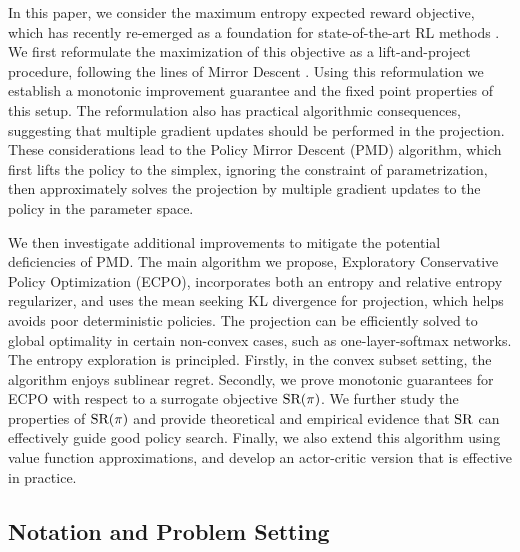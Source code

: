 In this paper, %
we consider the maximum entropy expected reward objective,
which has recently re-emerged as a foundation for state-of-the-art RL methods
\citep{fox2015taming,schulman2017equivalence,nachum2017bridging,haarnoja2017reinforcement,neu2017unified,levine2018reinforcement,deisenroth2013survey,daniel2012hierarchical}. 
We first reformulate the maximization of 
this objective as a lift-and-project procedure,
following the lines of Mirror Descent
\citep{nemirovskii1983problem,beck2003mirror}.
Using this reformulation we establish a monotonic improvement guarantee and  the fixed point properties of this setup.
The reformulation also has practical algorithmic consequences,
suggesting that multiple gradient updates should be performed
in the projection.
These considerations lead to the %
Policy Mirror Descent (PMD) algorithm,
which first lifts the policy to the simplex,
ignoring the constraint of parametrization,
then approximately solves the projection by multiple
gradient updates to the policy in the parameter space. 
%
%

We then investigate
additional improvements to mitigate the potential deficiencies of PMD.
The main algorithm we propose, Exploratory Conservative Policy Optimization (ECPO),
incorporates both an entropy and relative entropy regularizer,
and uses the mean seeking KL divergence for projection, which
helps avoids poor deterministic policies. The projection can be efficiently solved to global optimality
in certain non-convex cases,
such as one-layer-softmax networks.
The entropy exploration is principled.
Firstly, in the convex subset setting, the algorithm enjoys sublinear regret.
Secondly, we prove monotonic guarantees for ECPO with respect to a surrogate objective $\text{SR}(\pi)$.
We further study the properties of $\text{SR}(\pi)$ and provide theoretical
and empirical evidence that $\text{SR}$ 
can effectively guide good policy search.
Finally, we also extend this algorithm using value function approximations,
and develop an actor-critic version that is effective in practice.

\subsection{Notation and Problem Setting}
\label{subsec:notations_and_settings}

